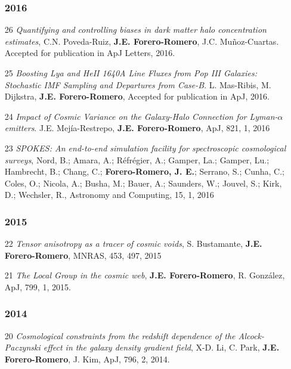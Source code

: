 \documentclass[a4paper,10pt]{article} %
\begin{document}
\begin{enumerate}

\subsubsection{2016}
\item[26]{\it Quantifying and controlling biases in dark matter halo
  concentration estimates}, C.N. Poveda-Ruiz, {\bf
  J.E. Forero-Romero}, J.C. Mu\~noz-Cuartas. Accepted for publication
  in ApJ Letters, 2016.

\item[25]{\it Boosting Lya and HeII 1640A Line Fluxes from Pop III
  Galaxies: Stochastic IMF Sampling and Departures from
  Case-B}. L. Mas-Ribis, M. Dijkstra, {\bf J.E. Forero-Romero},
  Accepted for publication in ApJ, 2016.

\item[24]{\it Impact of Cosmic Variance on the Galaxy-Halo Connection
  for Lyman-$\alpha$ emitters}.  J.E. Mej\'ia-Restrepo, {\bf
  J.E. Forero-Romero}, ApJ, 821, 1, 2016

\item[23]{\it SPOKES: An end-to-end simulation facility for
  spectroscopic cosmological surveys}, 
	Nord, B.; Amara, A.; R\'efr\'egier, A.; Gamper, La.; Gamper, Lu.;
        Hambrecht, B.; Chang, C.; {\bf Forero-Romero, J. E.}; Serrano, S.;
        Cunha, C.; Coles, O.; Nicola, A.; Busha, M.; Bauer, A.;
        Saunders, W.; Jouvel, S.; Kirk, D.; Wechsler, R., Astronomy
        and Computing, 15, 1, 2016


\subsubsection{2015}
\item[22]{\it Tensor anisotropy as a tracer of cosmic voids},
  S. Bustamante, {\bf   J.E. Forero-Romero}, MNRAS, 453,
  497, 2015

\item[21]{\it The Local Group in the cosmic web}, {\bf
  J.E. Forero-Romero}, R. Gonz\'alez, ApJ, 799, 1, 2015.

\subsubsection{2014}
\item[20]{\it Cosmological constraints from the redshift dependence of
  the Alcock-Paczynski effect in the galaxy density gradient field},
  X-D. Li, C. Park, {\bf J.E. Forero-Romero}, J. Kim, ApJ, 796, 2,
  2014.



\end{enumerate}
\end{document}
